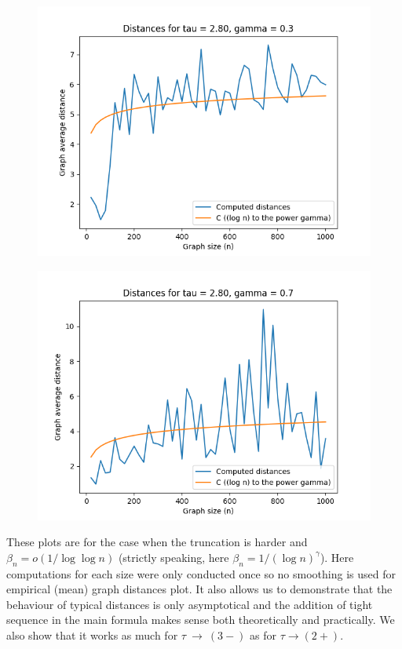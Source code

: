 \documentclass[a4paper]{article}
\begin{document}
\begin{minipage}{80mm}
	\begin{figure}[H]
		\includegraphics[scale=0.5]{log_gamma_03.png}
		\label{Fig1}
	\end{figure}
\end{minipage}
\begin{minipage}{80mm}
	\begin{figure}[H]
		\includegraphics[scale=0.5]{log_gamma_07.png}
		\label{Fig2}
	\end{figure}
\end{minipage}

These plots are for the case when the truncation is harder and $\beta_n = o(1/\log\log n)$ (strictly speaking, here $\beta_n = 1/(\log n)^\gamma$). Here computations for each size were only conducted once so no smoothing is used for empirical (mean) graph distances plot. It also allows us to demonstrate that the behaviour of typical distances is only asymptotical and the addition of tight sequence in the main formula makes sense both theoretically and practically. We also show that it works as much for $\tau~\rightarrow~(3-)$ as for $\tau \rightarrow (2+)$.
\end{document}
